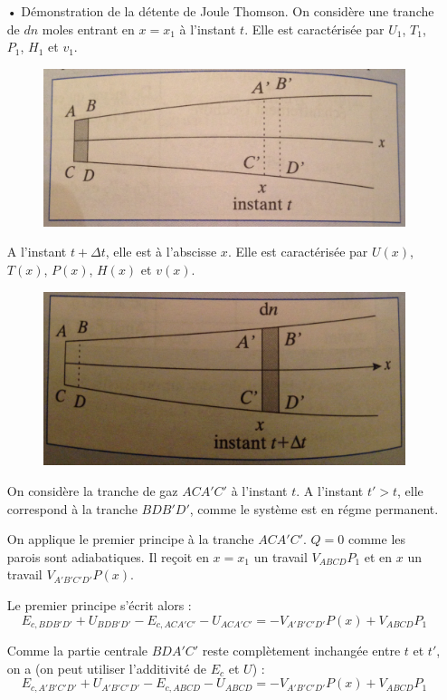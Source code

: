 \documentclass{report}
\begin{document}
\begin{itemize}

	\item[•] Démonstration de la détente de Joule Thomson. On considère une tranche de $dn$ moles entrant en $x=x_1$ à l'instant $t$. Elle est caractérisée par $U_1$, $T_1$, $P_1$, $H_1$ et $v_1$. 
	
\begin{figure}[!h]

\centering
\includegraphics[width=0.4\linewidth]{tuyere1.png}

\end{figure}	

A l'instant $t+\Delta t$, elle est à l'abscisse $x$. Elle est caractérisée par $U(x)$, $T(x)$, $P(x)$, $H(x)$ et $v(x)$. 
	
\begin{figure}[!h]
\centering
\includegraphics[width=0.4\linewidth]{tuyere2.png}
\end{figure}	

On considère la tranche de gaz $ACA'C'$ à l'instant $t$. A l'instant $t'>t$, elle correspond à la tranche $BDB'D'$, comme le système est en régme permanent. 

On applique le premier principe à la tranche $ACA'C'$. $Q=0$ comme les parois sont adiabatiques. 
Il reçoit en $x=x_1$ un travail $V_{ABCD}P_1$ et en $x$ un travail $V_{A'B'C'D'}P(x)$.

Le premier principe s'écrit alors :
\begin{equation}
	E_{c,BDB'D'} + U_{BDB'D'} - E_{c,ACA'C'} - U_{ACA'C'} = -V_{A'B'C'D'}P(x)+V_{ABCD}P_1
\end{equation}

Comme la partie centrale $BDA'C'$ reste complètement inchangée entre $t$ et $t'$, on a (on peut utiliser l'additivité de $E_c$ et $U$) : 
\begin{equation}
	E_{c,A'B'C'D'} + U_{A'B'C'D'} - E_{c,ABCD} - U_{ABCD}  = -V_{A'B'C'D'}P(x)+V_{ABCD}P_1
\end{equation}


\end{itemize}
\end{document}
